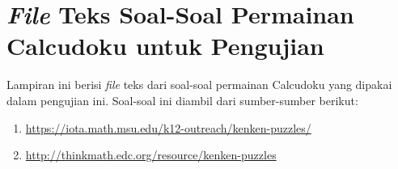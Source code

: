 \chapter{\textit{File} Teks Soal-Soal Permainan Calcudoku untuk Pengujian}
\label{chap:soalsoal}

Lampiran ini berisi \textit{file} teks dari soal-soal permainan Calcudoku yang dipakai dalam pengujian ini. Soal-soal ini diambil dari sumber-sumber berikut:

\begin{enumerate}
\item \url{https://iota.math.msu.edu/k12-outreach/kenken-puzzles/}
\item \url{http://thinkmath.edc.org/resource/kenken-puzzles}
\end{enumerate}


